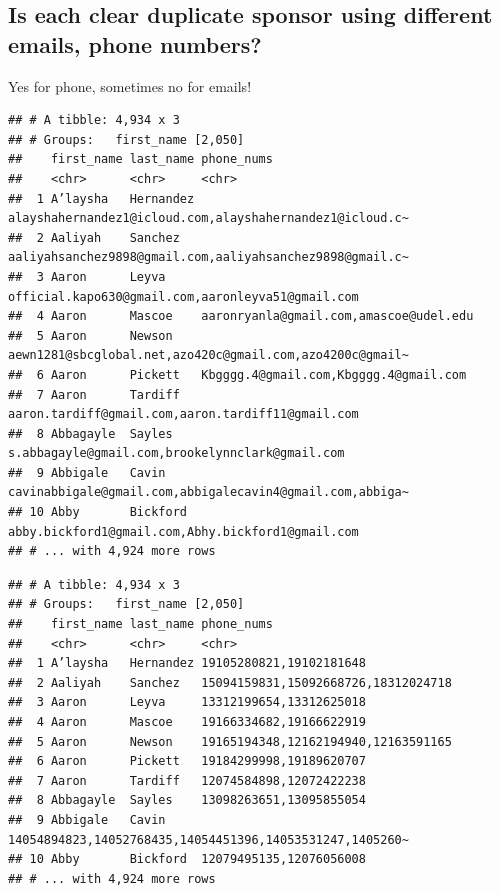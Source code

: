 \documentclass[
]{article}
\begin{document}
\hypertarget{is-each-clear-duplicate-sponsor-using-different-emails-phone-numbers}{%
\subsection{\texorpdfstring{Is each \textbf{clear} duplicate sponsor
using different emails, phone
numbers?}{Is each clear duplicate sponsor using different emails, phone numbers?}}\label{is-each-clear-duplicate-sponsor-using-different-emails-phone-numbers}}

Yes for phone, sometimes no for emails!

\begin{verbatim}
## # A tibble: 4,934 x 3
## # Groups:   first_name [2,050]
##    first_name last_name phone_nums                                              
##    <chr>      <chr>     <chr>                                                   
##  1 A’laysha   Hernandez alayshahernandez1@icloud.com,alayshahernandez1@icloud.c~
##  2 Aaliyah    Sanchez   aaliyahsanchez9898@gmail.com,aaliyahsanchez9898@gmail.c~
##  3 Aaron      Leyva     official.kapo630@gmail.com,aaronleyva51@gmail.com       
##  4 Aaron      Mascoe    aaronryanla@gmail.com,amascoe@udel.edu                  
##  5 Aaron      Newson    aewn1281@sbcglobal.net,azo420c@gmail.com,azo4200c@gmail~
##  6 Aaron      Pickett   Kbgggg.4@gmail.com,Kbgggg.4@gmail.com                   
##  7 Aaron      Tardiff   aaron.tardiff@gmail.com,aaron.tardiff11@gmail.com       
##  8 Abbagayle  Sayles    s.abbagayle@gmail.com,brookelynnclark@gmail.com         
##  9 Abbigale   Cavin     cavinabbigale@gmail.com,abbigalecavin4@gmail.com,abbiga~
## 10 Abby       Bickford  abby.bickford1@gmail.com,Abhy.bickford1@gmail.com       
## # ... with 4,924 more rows
\end{verbatim}

\begin{verbatim}
## # A tibble: 4,934 x 3
## # Groups:   first_name [2,050]
##    first_name last_name phone_nums                                              
##    <chr>      <chr>     <chr>                                                   
##  1 A’laysha   Hernandez 19105280821,19102181648                                 
##  2 Aaliyah    Sanchez   15094159831,15092668726,18312024718                     
##  3 Aaron      Leyva     13312199654,13312625018                                 
##  4 Aaron      Mascoe    19166334682,19166622919                                 
##  5 Aaron      Newson    19165194348,12162194940,12163591165                     
##  6 Aaron      Pickett   19184299998,19189620707                                 
##  7 Aaron      Tardiff   12074584898,12072422238                                 
##  8 Abbagayle  Sayles    13098263651,13095855054                                 
##  9 Abbigale   Cavin     14054894823,14052768435,14054451396,14053531247,1405260~
## 10 Abby       Bickford  12079495135,12076056008                                 
## # ... with 4,924 more rows
\end{verbatim}
\end{document}
